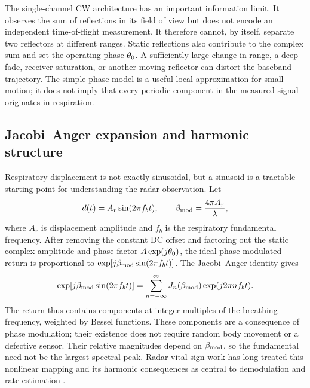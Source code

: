 The single-channel CW architecture has an important information limit. It observes the sum of
reflections in its field of view but does not encode an independent time-of-flight measurement.
It therefore cannot, by itself, separate two reflectors at different ranges. Static reflections
also contribute to the complex sum and set the operating phase $\theta_0$. A sufficiently large
change in range, a deep fade, receiver saturation, or another moving reflector can distort the
baseband trajectory. The simple phase model is a useful local approximation for small motion; it
does not imply that every periodic component in the measured signal originates in respiration.

\subsection{Jacobi--Anger expansion and harmonic structure}

Respiratory displacement is not exactly sinusoidal, but a sinusoid is a tractable starting point
for understanding the radar observation. Let
\begin{equation}
  d(t) = A_r\sin(2\pi f_b t),
  \qquad \beta_{\mathrm{mod}} = \frac{4\pi A_r}{\lambda},
  \label{eq:ch2_modulation_index}
\end{equation}
where $A_r$ is displacement amplitude and $f_b$ is the respiratory fundamental frequency. After
removing the constant DC offset and factoring out the static complex amplitude and phase factor
$A\exp(j\theta_0)$, the ideal phase-modulated return is proportional to
$\exp[j\beta_{\mathrm{mod}}\sin(2\pi f_b t)]$. The Jacobi--Anger identity gives
\begin{equation}
  \exp[j\beta_{\mathrm{mod}}\sin(2\pi f_b t)]
  = \sum_{n=-\infty}^{\infty}
      J_{n}\!\left(\beta_{\mathrm{mod}}\right)\exp(j2\pi n f_b t).
  \label{eq:ch2_jacobi_anger}
\end{equation}
The return thus contains components at integer multiples of the breathing frequency, weighted by
Bessel functions. These components are a consequence of phase modulation; their existence does
not require random body movement or a defective sensor. Their relative magnitudes depend on
$\beta_{\mathrm{mod}}$, so the fundamental need not be the largest spectral peak. Radar vital-sign work has
long treated this nonlinear mapping and its harmonic consequences as central to demodulation and
rate estimation \citep{li2008random,morgan2009novel,wu2013phase,li2013review,tu2013respiration}.

